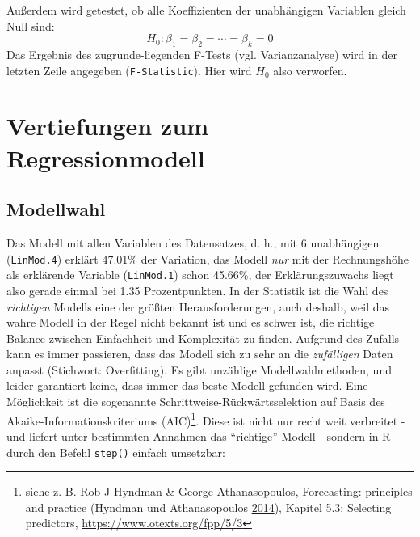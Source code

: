 \documentclass[12pt,ngerman,]{book}
\let\rmarkdownfootnote\footnote%
\def\footnote{\protect\rmarkdownfootnote}
\begin{document}
Außerdem wird getestet, ob alle Koeffizienten der unabhängigen Variablen
gleich Null sind: \[H_0: \beta_1=\beta_2=\cdots=\beta_k=0\] Das Ergebnis
des zugrunde-liegenden F-Tests (vgl. Varianzanalyse) wird in der letzten
Zeile angegeben (\texttt{F-Statistic}). Hier wird \(H_0\) also
verworfen.

\section{Vertiefungen zum
Regressionmodell}\label{vertiefungen-zum-regressionmodell}

\subsection{Modellwahl}\label{modellwahl}

Das Modell mit allen Variablen des Datensatzes, d. h., mit 6
unabhängigen (\texttt{LinMod.4}) erklärt 47.01\% der Variation, das
Modell \emph{nur} mit der Rechnungshöhe als erklärende Variable
(\texttt{LinMod.1}) schon 45.66\%, der Erklärungszuwachs liegt also
gerade einmal bei 1.35 Prozentpunkten. In der Statistik ist die Wahl des
\emph{richtigen} Modells eine der größten Herausforderungen, auch
deshalb, weil das wahre Modell in der Regel nicht bekannt ist und es
schwer ist, die richtige Balance zwischen Einfachheit und Komplexität zu
finden. Aufgrund des Zufalls kann es immer passieren, dass das Modell
sich zu sehr an die \emph{zufälligen} Daten anpasst (Stichwort:
Overfitting). Es gibt unzählige Modellwahlmethoden, und leider
garantiert keine, dass immer das beste Modell gefunden wird. Eine
Möglichkeit ist die sogenannte Schrittweise-Rückwärtsselektion auf Basis
des Akaike-Informationskriteriums (AIC)\footnote{siehe z. B. Rob J
  Hyndman \& George Athanasopoulos, Forecasting: principles and practice
  (Hyndman und Athanasopoulos
  \protect\hyperlink{ref-hyndman2014forecasting}{2014}), Kapitel 5.3:
  Selecting predictors, \url{https://www.otexts.org/fpp/5/3}}. Diese ist
nicht nur recht weit verbreitet - und liefert unter bestimmten Annahmen
das ``richtige'' Modell - sondern in R durch den Befehl \texttt{step()}
einfach umsetzbar:
\end{document}
